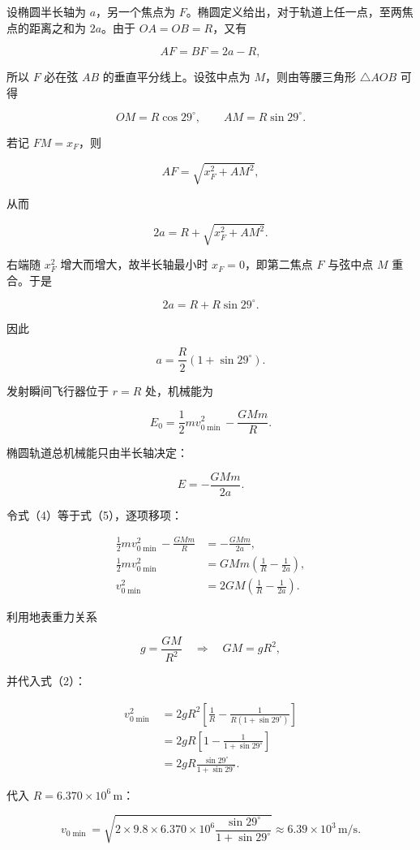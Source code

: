 \documentclass[12pt,a4paper,UTF8]{ctexart}
\begin{document}
设椭圆半长轴为 \(a\)，另一个焦点为
\(F\)。椭圆定义给出，对于轨道上任一点，至两焦点的距离之和为 \(2a\)。由于
\(OA=OB=R\)，又有

\[
AF=BF=2a-R,
\]

所以 \(F\) 必在弦 \(AB\) 的垂直平分线上。设弦中点为
\(M\)，则由等腰三角形 \(\triangle AOB\) 可得

\[
OM=R\cos29^\circ,
\qquad
AM=R\sin29^\circ.
\tag{1}
\]

若记 \(FM=x_F\)，则

\[
AF=\sqrt{x_F^2+AM^2},
\]

从而

\[
2a=R+\sqrt{x_F^2+AM^2}.
\]

右端随 \(x_F^2\) 增大而增大，故半长轴最小时 \(x_F=0\)，即第二焦点 \(F\)
与弦中点 \(M\) 重合。于是

\[
\boxed{2a=R+R\sin29^\circ}.
\tag{2}
\]

因此

\[
a=\frac R2\left(1+\sin29^\circ\right).
\tag{3}
\]

发射瞬间飞行器位于 \(r=R\) 处，机械能为

\[
E_0=\frac12mv_{0\min}^2-\frac{GMm}{R}.
\tag{4}
\]

椭圆轨道总机械能只由半长轴决定：

\[
E=-\frac{GMm}{2a}.
\tag{5}
\]

令式（4）等于式（5），逐项移项：

\[
\begin{aligned}
\frac12mv_{0\min}^2-\frac{GMm}{R}
&=-\frac{GMm}{2a},\\
\frac12mv_{0\min}^2
&=GMm\left(\frac1R-\frac1{2a}\right),\\
v_{0\min}^2
&=2GM\left(\frac1R-\frac1{2a}\right).
\end{aligned}
\tag{6}
\]

利用地表重力关系

\[
g=\frac{GM}{R^2}
\quad\Longrightarrow\quad
GM=gR^2,
\tag{7}
\]

并代入式（2）：

\[
\begin{aligned}
v_{0\min}^2
&=2gR^2\left[
\frac1R-\frac1{R(1+\sin29^\circ)}
\right]\\
&=2gR\left[
1-\frac1{1+\sin29^\circ}
\right]\\
&=2gR\frac{\sin29^\circ}{1+\sin29^\circ}.
\end{aligned}
\tag{8}
\]

代入 \(R=6.370\times10^6\,\mathrm m\)：

\[
v_{0\min}
=\sqrt{2\times9.8\times6.370\times10^6
\frac{\sin29^\circ}{1+\sin29^\circ}}
\approx6.39\times10^3\,\mathrm{m/s}.
\]
\end{document}
